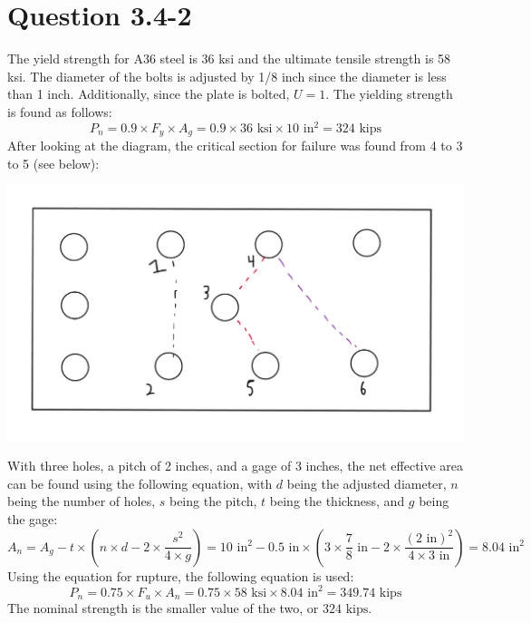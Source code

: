 \documentclass{article}
\begin{document}
\section*{Question 3.4-2}
The yield strength for A36 steel is 36 ksi and the ultimate tensile strength is 58 ksi. The diameter of the bolts is adjusted by 1/8 inch since the diameter is less than 1 inch. Additionally, since the plate is bolted, $U=1$. The yielding strength is found as follows: 
\[P_n=0.9\times F_y\times A_g=0.9\times 36\text{ ksi}\times 10\text{ in}^2=324\text{ kips}\] 
After looking at the diagram, the critical section for failure was found from 4 to 3 to 5 (see below): 
\begin{center}
    \includegraphics*[scale=0.3]{fig1.png} 
\end{center}
With three holes, a pitch of 2 inches, and a gage of 3 inches, the net effective area can be found using the following equation, with $d$ being the adjusted diameter, $n$ being the number of holes, $s$ being the pitch, $t$ being the thickness, and $g$ being the gage: 
\[A_n = A_g-t\times\left(n\times d- 2\times \frac{s^2}{4\times g}\right)=10\text{ in}^2-0.5\text{ in}\times\left(3\times \frac{7}{8}\text{ in}- 2\times \frac{(2\text{ in})^2}{4\times 3\text{ in}}\right)=8.04\text{ in}^2\]
Using the equation for rupture, the following equation is used: 
\[P_n=0.75\times F_u\times A_n=0.75\times58\text{ ksi}\times 8.04\text{ in}^2=349.74 \text{ kips}\]
The nominal strength is the smaller value of the two, or $\boxed{324\text { kips}}$.
\end{document}
